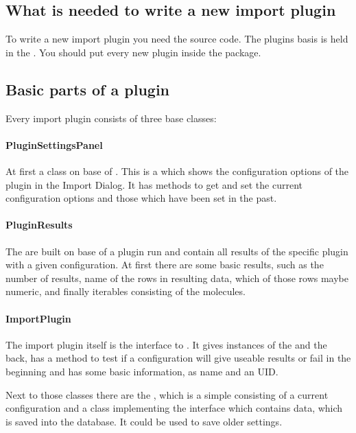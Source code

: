 \subsection{What is needed to write a new import plugin}
To write a new import plugin you need the \sh source code. The plugins basis is held in the . You should put every new plugin inside the  package.

\subsection{Basic parts of a plugin}
Every import plugin consists of three base classes:

\paragraph{PluginSettingsPanel}
At first a class on base of . This is a  which shows the configuration options of the plugin in the Import Dialog. It has methods to get and set the current configuration options and those which have been set in the past.

\paragraph{PluginResults}
The  are built on base of a plugin run and contain all results of the specific plugin with a given configuration. At first there are some basic results, such as the number of results, name of the rows in resulting data, which of those rows maybe numeric, and finally iterables consisting of the molecules.

\paragraph{ImportPlugin}
The import plugin itself is the interface to \sh. It gives instances of the  and the  back, has a method to test if a configuration will give useable results or fail in the beginning and has some basic information, as name and an UID.

Next to those classes there are the , which is a simple  consisting of a current configuration and a class implementing the  interface which contains data, which is saved into the database. It could be used to save older settings.

